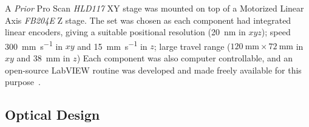 A \emph{Prior} Pro Scan \textit{HLD117} XY stage was mounted on top of a Motorized Linear Axis \textit{FB204E} Z stage.
The set was chosen as each component had integrated linear encoders, giving a suitable positional resolution (\SI{20}{\nano\meter} in \(xyz\));
speed \SI{300}{\milli\meter\per\second} in \(xy\) and \SI{15}{\milli\meter\per\second} in \(z\);
large travel range (\(\SI{120}{\milli\meter} \times \SI{72}{\milli\meter} \) in \(xy\) and \SI{38}{\milli\meter} in \(z\))%
Each component was also computer controllable, and an open-source LabVIEW routine was developed and made freely available for this purpose~\cite{russellSpimcontroller2017}.
%
%
\subsection{Optical Design}

